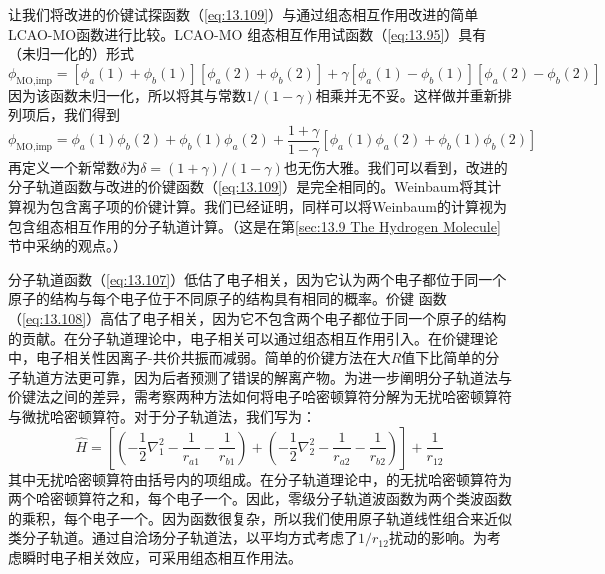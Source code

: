     让我们将改进的价键试探函数（\ref{eq:13.109}）与通过组态相互作用改进的简单LCAO-MO函数进行比较。LCAO-MO 组态相互作用试函数（\ref{eq:13.95}）具有（未归一化的）形式
    \begin{equation*}
        \phi_{\text{MO,imp}} = \left[\phi_a\left(1\right) + \phi_b\left(1\right)\right]\left[\phi_a\left(2\right) + \phi_b\left(2\right)\right] + \gamma\left[\phi_a\left(1\right) - \phi_b\left(1\right)\right]\left[\phi_a\left(2\right) - \phi_b\left(2\right)\right]
    \end{equation*}
    因为该函数未归一化，所以将其与常数$1/\left(1-\gamma\right)$相乘并无不妥。这样做并重新排列项后，我们得到
    \begin{equation*}
        \phi_{\text{MO,imp}} = \phi_a\left(1\right)\phi_b\left(2\right) + \phi_b\left(1\right)\phi_a\left(2\right) + \frac{1+\gamma}{1-\gamma}\left[\phi_a\left(1\right)\phi_a\left(2\right) + \phi_b\left(1\right)\phi_b\left(2\right)\right]
    \end{equation*}
    再定义一个新常数$\delta$为$\delta = \left(1+\gamma\right)/\left(1-\gamma\right)$也无伤大雅。我们可以看到，改进的分子轨道函数与改进的价键函数（\ref{eq:13.109}）是完全相同的。Weinbaum将其计算视为包含离子项的价键计算。我们已经证明，同样可以将Weinbaum的计算视为包含组态相互作用的分子轨道计算。（这是在第\ref{sec:13.9 The Hydrogen Molecule}节中采纳的观点。）

    分子轨道函数（\ref{eq:13.107}）低估了电子相关，因为它认为两个电子都位于同一个原子的结构与每个电子位于不同原子的结构具有相同的概率。价键 函数（\ref{eq:13.108}）高估了电子相关，因为它不包含两个电子都位于同一个原子的结构的贡献。在分子轨道理论中，电子相关可以通过组态相互作用引入。在价键理论中，电子相关性因离子-共价共振而减弱。简单的价键方法在大$R$值下比简单的分子轨道方法更可靠，因为后者预测了错误的解离产物。为进一步阐明分子轨道法与价键法之间的差异，需考察两种方法如何将电子哈密顿算符分解为无扰哈密顿算符与微扰哈密顿算符。对于分子轨道法，我们写为：
    \begin{equation*}
        \hat{H} = \left[ \left( -\frac{1}{2} \nabla_1^2 - \frac{1}{r_{a1}} - \frac{1}{r_{b1}} \right) + \left( -\frac{1}{2} \nabla_2^2 - \frac{1}{r_{a2}} - \frac{1}{r_{b2}} \right) \right] + \frac{1}{r_{12}}
    \end{equation*}
    其中无扰哈密顿算符由括号内的项组成。在分子轨道理论中，的无扰哈密顿算符为两个哈密顿算符之和，每个电子一个。因此，零级分子轨道波函数为两个类波函数的乘积，每个电子一个。因为函数很复杂，所以我们使用原子轨道线性组合来近似类分子轨道。通过自洽场分子轨道法，以平均方式考虑了$1/r_{12}$扰动的影响。为考虑瞬时电子相关效应，可采用组态相互作用法。

